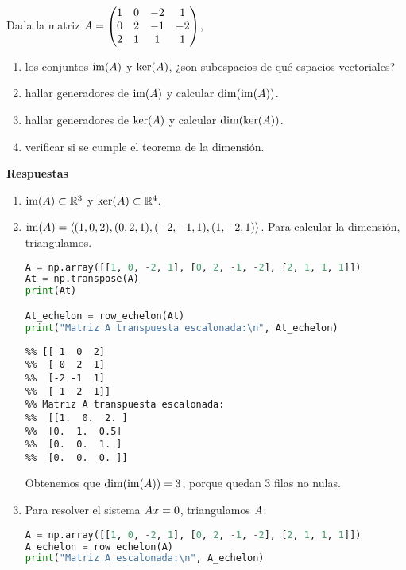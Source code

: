 \begin{ejemplo} Dada la matriz $\Ab = \begin{pmatrix} 1 & 0 & -2 & 1 \\ 0 & 2 & -1 & -2 \\ 2 & 1 & 1 & 1 \end{pmatrix}$,
\begin{enumerate}
\item los conjuntos $\im(\Ab)$ y $\ker(\Ab)$, ¿son subespacios de qué espacios vectoriales?
\item hallar generadores de $\im(\Ab)$ y calcular $\dim(\im(\Ab))$.
\item hallar generadores de $\ker(\Ab)$ y calcular $\dim(\ker(\Ab))$.
\item verificar si se cumple el teorema de la dimensión.
\end{enumerate}

\textbf{Respuestas}
\begin{enumerate}
\item   $\im(\Ab) \subset \R^3$ y $\ker(\Ab) \subset \R^4$.
\item   $\im(\Ab) = \langle (1,0,2), (0, 2, 1), (-2, -1, 1), (1, -2, 1)\rangle$. Para calcular la dimensión, triangulamos.

\begin{Shaded}
\begin{lstlisting}[language=python]
A = np.array([[1, 0, -2, 1], [0, 2, -1, -2], [2, 1, 1, 1]])
At = np.transpose(A)
print(At)

At_echelon = row_echelon(At)
print("Matriz A transpuesta escalonada:\n", At_echelon)
\end{lstlisting}
\end{Shaded}

\begin{verbatim}
%% [[ 1  0  2]
%%  [ 0  2  1]
%%  [-2 -1  1]
%%  [ 1 -2  1]]
%% Matriz A transpuesta escalonada:
%%  [[1.  0.  2. ]
%%  [0.  1.  0.5]
%%  [0.  0.  1. ]
%%  [0.  0.  0. ]]
\end{verbatim}

Obtenemos que $\dim(\im(\Ab)) = 3$, porque quedan 3 filas no nulas.

\item Para resolver el sistema $\Ab\xb = 0$, triangulamos $\Ab$:


\begin{Shaded}
\begin{lstlisting}[language=python]
A = np.array([[1, 0, -2, 1], [0, 2, -1, -2], [2, 1, 1, 1]])
A_echelon = row_echelon(A)
print("Matriz A escalonada:\n", A_echelon)
\end{lstlisting}
\end{Shaded}


\end{enumerate}
\end{ejemplo}
